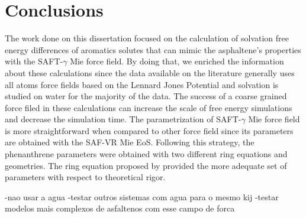 \chapter{Conclusions} %

\label{Chapter6} %
The work done on this dissertation focused on the calculation of solvation free energy differences of aromatics solutes that can mimic the asphaltene's properties with the SAFT-$\gamma$ Mie force field. By doing that, we enriched the information about these calculations since the data available on the literature generally uses all atoms force fields based on the Lennard Jones Potential and solvation is studied on water for the majority of the data. The success of a coarse grained force filed in these calculations can increase the scale of free energy simulations and decrease the simulation time. The parametrization of SAFT-$\gamma$ Mie force field is more straightforward when compared to other force field since its parameters are obtained with the SAF-VR Mie EoS. Following this strategy, the phenanthrene parameters were obtained with two different ring equations and geometries. The ring equation proposed by  provided the more adequate set of parameters with respect to theoretical rigor.    

-nao usar a agua
-testar outros sistemas com agua para o mesmo kij
-testar modelos mais complexos de asfaltenos com esse campo de forca
